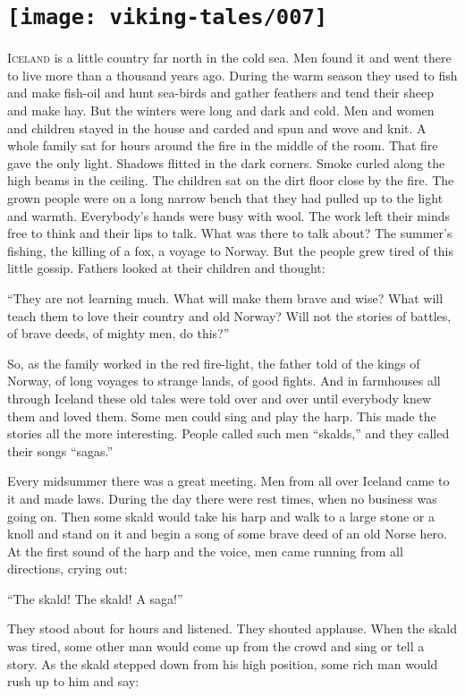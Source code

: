 \chapter[What the Sagas Were]{
    \texttt{[image: viking-tales/007]}}

\lettrine{I}{celand} is a little country far north in the cold sea. Men
found it and went there to live more than a thousand years ago. During
the warm season they used to fish and make fish-oil and hunt sea-birds
and gather feathers and tend their sheep and make hay. But the winters
were long and dark and cold. Men and women and children stayed in the
house and carded and spun and wove and knit. A whole family sat for hours
around the fire in the middle of the room. That fire gave the only light.
Shadows flitted in the dark corners. Smoke curled along the high beams
in the ceiling. The children sat on the dirt floor close by the fire.
The grown people were on a long narrow bench that they had pulled up to
the light and warmth. Everybody's hands were busy with wool. The work
left their minds free to think and their lips to talk. What was there to
talk about? The summer's fishing, the killing of a fox, a voyage to
Norway. But the people grew tired of this little gossip. Fathers looked
at their children and thought:

``They are not learning much. What will make them brave and wise? What
will teach them to love their country and old Norway? Will not the
stories of battles, of brave deeds, of mighty men, do this?''

So, as the family worked in the red fire-light, the father told of the
kings of Norway, of long voyages to strange lands, of good fights. And
in farmhouses all through Iceland these old tales were told over and
over until everybody knew them and loved them. Some men could sing and
play the harp. This made the stories all the more interesting. People
called such men ``skalds,'' and they called their songs ``sagas.''

Every midsummer there was a great meeting. Men from all over Iceland
came to it and made laws. During the day there were rest times, when no
business was going on. Then some skald would take his harp and walk to a
large stone or a knoll and stand on it and begin a song of some brave
deed of an old Norse hero. At the first sound of the harp and the voice,
men came running from all directions, crying out:

``The skald! The skald! A saga!''

They stood about for hours and listened. They shouted applause. When the
skald was tired, some other man would come up from the crowd and sing or
tell a story. As the skald stepped down from his high position, some
rich man would rush up to him and say:

